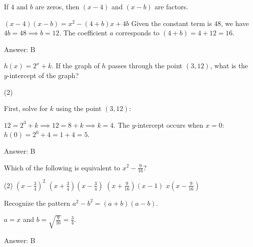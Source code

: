 \documentclass[11pt,paper=a4,answers]{exam}
\begin{document}
\begin{questions}
\begin{solution}
If $4$ and $b$ are zeros, then $(x - 4)$ and $(x - b)$ are factors.
\vspace{5pt}
\begin{center}
$(x - 4)(x - b) = x^2 - (4 + b)x + 4b$
\vspace{5pt}
Given the constant term is $48$, we have $4b = 48 \implies b = 12$.
\vspace{5pt}
The coefficient $a$ corresponds to $(4 + b) = 4 + 12 = 16$.
\end{center}
\vspace{5pt}
Answer: \colorbox{yellow!100}{B}
\end{solution}

\vspace{1cm}

\question
$h(x) = 2^x + k$. If the graph of $h$ passes through the point $(3, 12)$, what is the $y$-intercept of the graph?
\begin{tasks}(2)
       
\end{tasks}

\begin{solution}
First, solve for $k$ using the point $(3, 12)$:
\vspace{5pt}
\begin{center}
$12 = 2^3 + k \implies 12 = 8 + k \implies k = 4$.
\vspace{5pt}
The $y$-intercept occurs when $x = 0$:
\vspace{5pt}
$h(0) = 2^0 + 4 = 1 + 4 = 5$.
\end{center}
\vspace{5pt}
Answer: \colorbox{yellow!100}{B}
\end{solution}

\vspace{1cm}

\question
Which of the following is equivalent to $x^2 - \frac{9}{16}$?
\begin{tasks}(2)
    \task $(x - \frac{3}{4})^2$
    \task $(x + \frac{3}{4})(x - \frac{3}{4})$
    \task $(x + \frac{9}{16})(x - 1)$
    \task $x(x - \frac{9}{16})$
\end{tasks}

\begin{solution}
Recognize the pattern $a^2 - b^2 = (a+b)(a-b)$.
\vspace{5pt}
\begin{center}
$a = x$ and $b = \sqrt{\frac{9}{16}} = \frac{3}{4}$.
\end{center}
\vspace{5pt}
Answer: \colorbox{yellow!100}{B}
\end{solution}


\end{questions}
\end{document}
